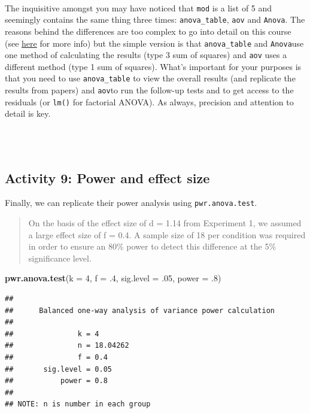 \documentclass[]{book}
\newenvironment{Shaded}{\begin{snugshade}}{\end{snugshade}}
\newcommand{\DataTypeTok}[1]{\textcolor[rgb]{0.13,0.29,0.53}{#1}}
\newcommand{\DecValTok}[1]{\textcolor[rgb]{0.00,0.00,0.81}{#1}}
\newcommand{\FloatTok}[1]{\textcolor[rgb]{0.00,0.00,0.81}{#1}}
\newcommand{\KeywordTok}[1]{\textcolor[rgb]{0.13,0.29,0.53}{\textbf{#1}}}
\newcommand{\NormalTok}[1]{#1}
\newenvironment{warning}
    {
    \hline\\
    }
    { 
    \\\\\hline
    }
\begin{document}
\begin{warning}
The inquisitive amongst you may have noticed that \texttt{mod} is a list
of 5 and seemingly contains the same thing three times:
\texttt{anova\_table}, \texttt{aov} and \texttt{Anova}. The reasons
behind the differences are too complex to go into detail on this course
(see \href{https://rcompanion.org/rcompanion/d_04.html}{here} for more
info) but the simple version is that \texttt{anova\_table} and
\texttt{Anova}use one method of calculating the results (type 3 sum of
squares) and \texttt{aov} uses a different method (type 1 sum of
squares). What's important for your purposes is that you need to use
\texttt{anova\_table} to view the overall results (and replicate the
results from papers) and \texttt{aov}to run the follow-up tests and to
get access to the residuals (or \texttt{lm()} for factorial ANOVA). As
always, precision and attention to detail is key.
\end{warning}

\hypertarget{activity-9-power-and-effect-size}{%
\subsection{Activity 9: Power and effect size}\label{activity-9-power-and-effect-size}}

Finally, we can replicate their power analysis using \texttt{pwr.anova.test}.

\begin{quote}
On the basis of the effect size of d = 1.14 from Experiment 1, we assumed a large effect size of f = 0.4. A sample size of 18 per condition was required in order to ensure an 80\% power to detect this difference at the 5\% significance level.
\end{quote}

\begin{Shaded}
\begin{Highlighting}[]
\KeywordTok{pwr.anova.test}\NormalTok{(}\DataTypeTok{k =} \DecValTok{4}\NormalTok{, }\DataTypeTok{f =} \FloatTok{.4}\NormalTok{, }\DataTypeTok{sig.level =} \FloatTok{.05}\NormalTok{, }\DataTypeTok{power =} \FloatTok{.8}\NormalTok{)}
\end{Highlighting}
\end{Shaded}

\begin{verbatim}
## 
##      Balanced one-way analysis of variance power calculation 
## 
##               k = 4
##               n = 18.04262
##               f = 0.4
##       sig.level = 0.05
##           power = 0.8
## 
## NOTE: n is number in each group
\end{verbatim}
\end{document}
